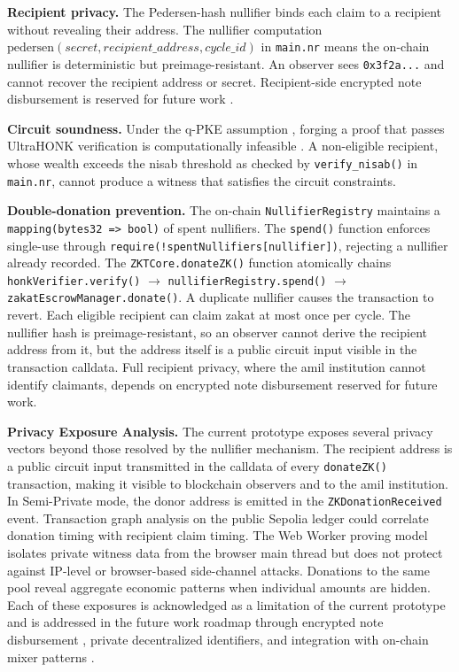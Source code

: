 \documentclass[conference]{IEEEtran}
\begin{document}
\textbf{Recipient privacy.} The Pedersen-hash nullifier \cite{b_aztec} binds each claim to a recipient without revealing their address. The nullifier computation $\text{pedersen}(\mathit{secret}, \mathit{recipient\_address}, \mathit{cycle\_id})$ in \texttt{main.nr} means the on-chain nullifier is deterministic but preimage-resistant. An observer sees \texttt{0x3f2a...} and cannot recover the recipient address or secret. Recipient-side encrypted note disbursement is reserved for future work \cite{b_bbs_w3c}.

\textbf{Circuit soundness.} Under the q-PKE assumption \cite{b_zkp_blockchain}, forging a proof that passes UltraHONK verification is computationally infeasible \cite{b_zkp_vuln}. A non-eligible recipient, whose wealth exceeds the nisab threshold as checked by \texttt{verify\_nisab()} in \texttt{main.nr}, cannot produce a witness that satisfies the circuit constraints.

\textbf{Double-donation prevention.} The on-chain \texttt{NullifierRegistry} maintains a \texttt{mapping(bytes32 => bool)} of spent nullifiers. The \texttt{spend()} function enforces single-use through \texttt{require(!spentNullifiers[nullifier])}, rejecting a nullifier already recorded. The \texttt{ZKTCore.donateZK()} function atomically chains \texttt{honkVerifier.verify()} $\rightarrow$ \texttt{nullifierRegistry.spend()} $\rightarrow$ \texttt{zakatEscrowManager.donate()}. A duplicate nullifier causes the transaction to revert. Each eligible recipient can claim zakat at most once per cycle. The nullifier hash is preimage-resistant, so an observer cannot derive the recipient address from it, but the address itself is a public circuit input visible in the transaction calldata. Full recipient privacy, where the amil institution cannot identify claimants, depends on encrypted note disbursement reserved for future work.

\noindent\textbf{Privacy Exposure Analysis.} The current prototype exposes several privacy vectors beyond those resolved by the nullifier mechanism. The recipient address is a public circuit input transmitted in the calldata of every \texttt{donateZK()} transaction, making it visible to blockchain observers and to the amil institution. In Semi-Private mode, the donor address is emitted in the \texttt{ZKDonationReceived} event. Transaction graph analysis on the public Sepolia ledger could correlate donation timing with recipient claim timing. The Web Worker proving model isolates private witness data from the browser main thread but does not protect against IP-level or browser-based side-channel attacks. Donations to the same pool reveal aggregate economic patterns when individual amounts are hidden. Each of these exposures is acknowledged as a limitation of the current prototype and is addressed in the future work roadmap through encrypted note disbursement \cite{b_bbs_w3c}, private decentralized identifiers, and integration with on-chain mixer patterns \cite{b_mixer_analysis}.
\end{document}
